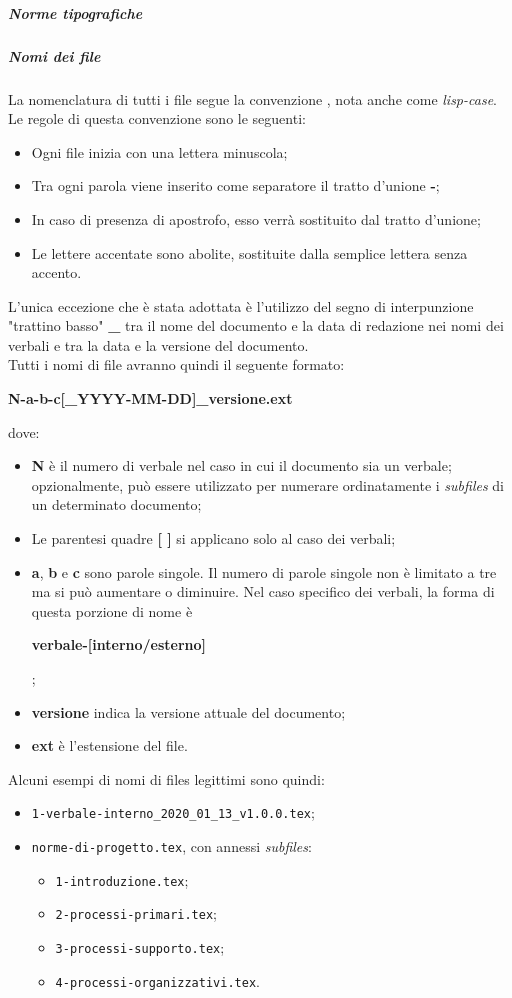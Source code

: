 \documentclass[../norme-di-progetto.tex]{subfiles}
\begin{document}
\subparagraph{Norme tipografiche}
\subparagraph*{Nomi dei file}
La nomenclatura di tutti i file segue la convenzione , nota anche come \textit{lisp-case}. Le regole di questa convenzione sono le seguenti:
\begin{itemize}
  \item Ogni file inizia con una lettera minuscola;
  \item Tra ogni parola viene inserito come separatore il tratto d'unione \textbf{-};
  \item In caso di presenza di apostrofo, esso verrà sostituito dal tratto d'unione;
  \item Le lettere accentate sono abolite, sostituite dalla semplice lettera senza accento.
\end{itemize}
L'unica eccezione che è stata adottata è l'utilizzo del segno di interpunzione "trattino basso" \textbf{\_} tra il nome del documento e la data di redazione nei nomi dei verbali e tra la data e la versione del documento. \\
Tutti i nomi di file avranno quindi il seguente formato: \\ \begin{center}
  \centering
  \textbf{N-a-b-c[\_YYYY-MM-DD]\_versione.ext}
\end{center} dove:
\begin{itemize}
  \item \textbf{N} è il numero di verbale nel caso in cui il documento sia un verbale; opzionalmente, può essere utilizzato per numerare ordinatamente i \textit{subfiles} di un determinato documento;
  \item Le parentesi quadre \textbf{[ ]} si applicano solo al caso dei verbali;
  \item \textbf{a}, \textbf{b} e \textbf{c} sono parole singole. Il numero di parole singole non è limitato a tre ma si può aumentare o diminuire. Nel caso specifico dei verbali, la forma di questa porzione di nome è \\ \begin{center}
    \centering
    \textbf{verbale-[interno/esterno]}
  \end{center};
  \item \textbf{versione} indica la versione attuale del documento;
  \item \textbf{ext} è l'estensione del file.
\end{itemize}
Alcuni esempi di nomi di files legittimi sono quindi:
\begin{itemize}
  \item \texttt{1-verbale-interno\_2020\_01\_13\_v1.0.0.tex};
  \item \texttt{norme-di-progetto.tex}, con annessi \textit{subfiles}:
    \begin{itemize}
      \item \texttt{1-introduzione.tex};
      \item \texttt{2-processi-primari.tex};
      \item \texttt{3-processi-supporto.tex};
      \item \texttt{4-processi-organizzativi.tex}.
    \end{itemize}
\end{itemize}
\end{document}

